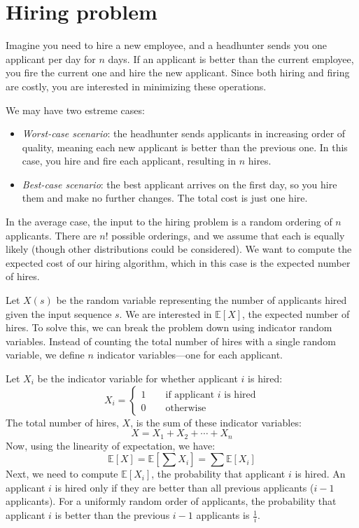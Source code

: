 \section{Hiring problem}

Imagine you need to hire a new employee, and a headhunter sends you one applicant per day for $n$ days. 
If an applicant is better than the current employee, you fire the current one and hire the new applicant. 
Since both hiring and firing are costly, you are interested in minimizing these operations.

We may have two estreme cases: 
\begin{itemize}
    \item \textit{Worst-case scenario}: the headhunter sends applicants in increasing order of quality, meaning each new applicant is better than the previous one. 
        In this case, you hire and fire each applicant, resulting in $n$ hires.
    \item \textit{Best-case scenario}: the best applicant arrives on the first day, so you hire them and make no further changes. 
        The total cost is just one hire.
\end{itemize}
In the average case, the input to the hiring problem is a random ordering of $n$ applicants. 
There are $n!$ possible orderings, and we assume that each is equally likely (though other distributions could be considered). 
We want to compute the expected cost of our hiring algorithm, which in this case is the expected number of hires.

Let $X(s)$ be the random variable representing the number of applicants hired given the input sequence $s$. 
We are interested in $\mathbb{E}[X]$, the expected number of hires.
To solve this, we can break the problem down using indicator random variables. 
Instead of counting the total number of hires with a single random variable, we define $n$ indicator variables—one for each applicant.

Let $X_i$ be the indicator variable for whether applicant $i$ is hired:
\[X_i=\begin{cases}
    1\qquad\text{if applicant }i\text{ is hired} \\
    0\qquad\text{otherwise}
\end{cases}\]
The total number of hires, $X$, is the sum of these indicator variables:
\[X=X_1+X_2+\cdots+X_n\]
Now, using the linearity of expectation, we have:
\[\mathbb{E}[X]=\mathbb{E}\left[\sum X_i\right]=\sum\mathbb{E}[X_i]\]
Next, we need to compute $\mathbb{E}[X_i]$, the probability that applicant $i$ is hired. 
An applicant $i$ is hired only if they are better than all previous applicants ($i-1$ applicants). 
For a uniformly random order of applicants, the probability that applicant $i$ is better than the previous $i-1$ applicants is $\frac{1}{i}$.

